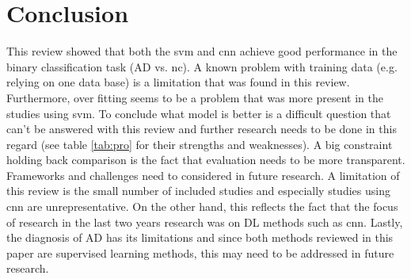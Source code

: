 \section{Conclusion} \label{Discussion} 
This review showed that both the \gls{svm} and \gls{cnn} achieve good performance in the binary classification task (\gls{AD} vs. \gls{nc}). A known problem with training data (e.g. relying on one data base) is a limitation that was found in this review. Furthermore, over fitting  seems to be a problem that was more present in the studies using \gls{svm}. To conclude what model is better is a difficult question that can't be answered with this review and further research needs to be done in this regard (see table \ref{tab:pro} for their strengths and weaknesses). A big constraint holding back comparison is the fact that evaluation needs to be more transparent. Frameworks \autocite[e.g.][]{wenConvolutionalNeuralNetworks2020} and challenges \autocite[e.g.][]{bron} need to considered in future research. 
A limitation of this review is the small number of included studies and especially studies using \gls{cnn} are unrepresentative. On the other hand, this reflects the fact that the focus of research in the last two years research was on \gls{DL} methods such as \gls{cnn}.
Lastly, the diagnosis of \gls{AD} has its limitations and since both methods reviewed in this paper are supervised learning methods, this may need to be addressed in future research. 